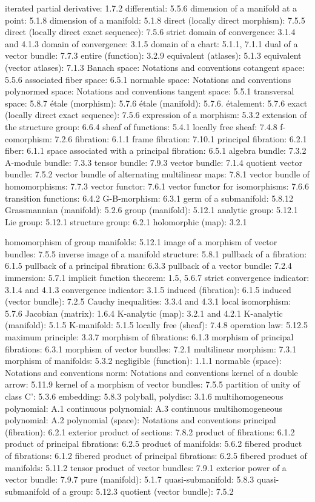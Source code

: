iterated partial derivative: 1.7.2 differential: 5.5.6 dimension of a manifold at a point: 5.1.8 dimension of a manifold: 5.1.8 direct (locally direct morphism): 7.5.5 direct (locally direct exact sequence): 7.5.6 strict domain of convergence: 3.1.4 and 4.1.3 domain of convergence: 3.1.5 domain of a chart: 5.1.1, 7.1.1 dual of a vector bundle: 7.7.3 entire (function): 3.2.9 equivalent (atlases): 5.1.3 equivalent (vector atlases): 7.1.3 Banach space: Notations and conventions cotangent space: 5.5.6 associated fiber space: 6.5.1 normable space: Notations and conventions polynormed space: Notations and conventions tangent space: 5.5.1 transversal space: 5.8.7 étale (morphism): 5.7.6 étale (manifold): 5.7.6. étalement: 5.7.6 exact (locally direct exact sequence): 7.5.6 expression of a morphism: 5.3.2 extension of the structure group: 6.6.4 sheaf of functions: 5.4.1 locally free sheaf: 7.4.8 f-comorphism: 7.2.6 fibration: 6.1.1 frame fibration: 7.10.1 principal fibration: 6.2.1 fiber: 6.1.1 space associated with a principal fibration: 6.5.1 algebra bundle: 7.3.2 A-module bundle: 7.3.3 tensor bundle: 7.9.3 vector bundle: 7.1.4 quotient vector bundle: 7.5.2 vector bundle of alternating multilinear maps: 7.8.1 vector bundle of homomorphisms: 7.7.3 vector functor: 7.6.1 vector functor for isomorphisms: 7.6.6 transition functions: 6.4.2 G-B-morphism: 6.3.1 germ of a submanifold: 5.8.12 Grassmannian (manifold): 5.2.6 group (manifold): 5.12.1 analytic group: 5.12.1 Lie group: 5.12.1 structure group: 6.2.1 holomorphic (map): 3.2.1

homomorphism of group manifolds: 5.12.1 image of a morphism of vector bundles: 7.5.5 inverse image of a manifold structure: 5.8.1 pullback of a fibration: 6.1.5 pullback of a principal fibration: 6.3.3 pullback of a vector bundle: 7.2.4 immersion: 5.7.1 implicit function theorem: 1.5, 5.6.7 strict convergence indicator: 3.1.4 and 4.1.3 convergence indicator: 3.1.5 induced (fibration): 6.1.5 induced (vector bundle): 7.2.5 Cauchy inequalities: 3.3.4 and 4.3.1 local isomorphism: 5.7.6 Jacobian (matrix): 1.6.4 K-analytic (map): 3.2.1 and 4.2.1 K-analytic (manifold): 5.1.5 K-manifold: 5.1.5 locally free (sheaf): 7.4.8 operation law: 5.12.5 maximum principle: 3.3.7 morphism of fibrations: 6.1.3 morphism of principal fibrations: 6.3.1 morphism of vector bundles: 7.2.1 multilinear morphism: 7.3.1 morphism of manifolds: 5.3.2 negligible (function): 1.1.1 normable (space): Notations and conventions norm: Notations and conventions kernel of a double arrow: 5.11.9 kernel of a morphism of vector bundles: 7.5.5 partition of unity of class C': 5.3.6 embedding: 5.8.3 polyball, polydisc: 3.1.6 multihomogeneous polynomial: A.1 continuous polynomial: A.3 continuous multihomogeneous polynomial: A.2 polynomial (space): Notations and conventions principal (fibration): 6.2.1 exterior product of sections: 7.8.2 product of fibrations: 6.1.2 product of principal fibrations: 6.2.5 product of manifolds: 5.6.2 fibered product of fibrations: 6.1.2 fibered product of principal fibrations: 6.2.5 fibered product of manifolds: 5.11.2 tensor product of vector bundles: 7.9.1 exterior power of a vector bundle: 7.9.7 pure (manifold): 5.1.7 quasi-submanifold: 5.8.3 quasi-submanifold of a group: 5.12.3 quotient (vector bundle): 7.5.2

